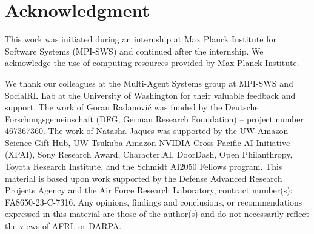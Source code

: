 \section*{Acknowledgment}
This work was initiated during an internship at Max Planck Institute for Software Systems (MPI-SWS) and continued after the internship. We acknowledge the use of computing resources provided by Max Planck Institute.

We thank our colleagues at the Multi-Agent Systems group at MPI-SWS and SocialRL Lab at the University of Washington for their valuable feedback and support. The work of Goran Radanovi\'{c} was funded by the Deutsche Forschungsgemeinschaft (DFG, German Research Foundation) -- project number 467367360. The work of Natasha Jaques was supported by the UW-Amazon Science Gift Hub, UW-Tsukuba Amazon NVIDIA Cross Pacific AI Initiative (XPAI), Sony Research Award, Character.AI, DoorDash, Open Philanthropy, Toyota Research Institute, and the Schmidt AI2050 Fellows program. This material is based upon work supported by the Defense Advanced Research Projects Agency and the Air Force Research Laboratory, contract number(s): FA8650-23-C-7316. Any opinions, findings and conclusions, or recommendations expressed in this material are those of the author(s) and do not necessarily reflect the views of AFRL or DARPA.